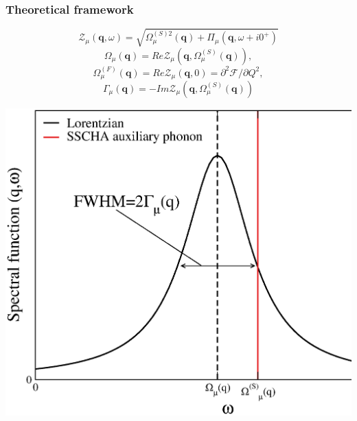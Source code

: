 \documentclass{beamer}
\begin{document}
\begin{frame}

\frametitle{Theoretical framework}
\vspace{-0.2cm}
\begin{equation}
\nonumber
\mathcal{Z}_{\mu}(\mathbf{q},\omega)=\sqrt{\Omega_{\mu}^{(S)2}(\mathbf{q})+\Pi_{\mu}(\mathbf{q},\omega+i0^{+})}
\end{equation}
\begin{equation}
\nonumber
\Omega_{\mu}(\mathbf{q})=Re\mathcal{Z}_{\mu}(\mathbf{q},\Omega^{(S)}_{\mu}(\mathbf{q})),
\end{equation}
\begin{equation}
\nonumber
\Omega_{\mu}^{(F)}(\mathbf{q})=Re\mathcal{Z}_{\mu}(\mathbf{q},0)=\partial^{2}\mathcal{F}/\partial Q^{2},
\end{equation}
\begin{equation}
\nonumber
\Gamma_{\mu}(\mathbf{q})=-Im\mathcal{Z}_{\mu}(\mathbf{q},\Omega^{(S)}_{\mu}(\mathbf{q}))
\end{equation}
\begin{center}
  \includegraphics[width=0.55\linewidth]{Pictures/THEORY/ins-toy2.eps}
 \end{center}

\end{frame}

\end{document}
